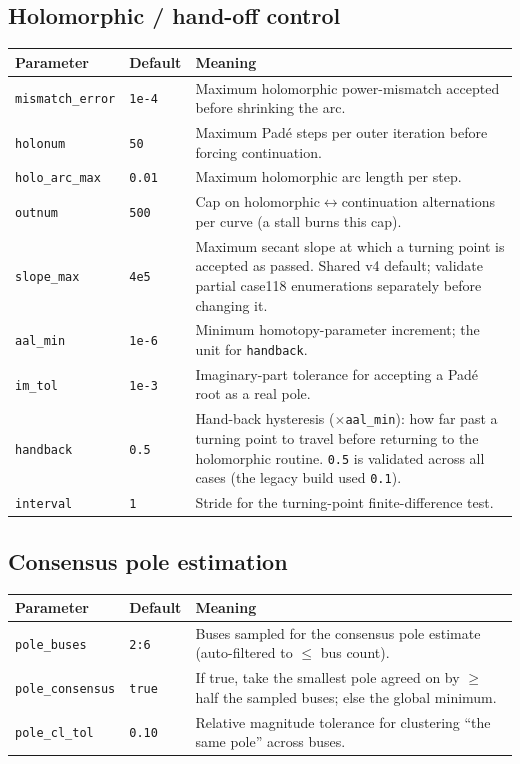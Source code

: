 \documentclass[11pt,a4paper]{article}
\newcommand{\code}[1]{\texttt{#1}}
\begin{document}
\subsection{Holomorphic / hand-off control}
\begin{center}\small
\begin{longtable}{@{}p{}p{}p{}@{}}
\toprule
\textbf{Parameter} & \textbf{Default} & \textbf{Meaning}\\
\midrule\endhead
\code{mismatch_error}& \code{1e-4} & Maximum holomorphic power-mismatch accepted before shrinking the arc.\\
\code{holonum}      & \code{50}   & Maximum Pad\'e steps per outer iteration before forcing continuation.\\
\code{holo_arc_max} & \code{0.01} & Maximum holomorphic arc length per step.\\
\code{outnum}       & \code{500}  & Cap on holomorphic$\leftrightarrow$continuation alternations per curve (a stall burns this cap).\\
\code{slope_max}    & \code{4e5}  & Maximum secant slope at which a turning point is accepted as passed. Shared v4 default; validate partial case118 enumerations separately before changing it.\\
\code{aal_min}      & \code{1e-6} & Minimum homotopy-parameter increment; the unit for \code{handback}.\\
\code{im_tol}       & \code{1e-3} & Imaginary-part tolerance for accepting a Pad\'e root as a real pole.\\
\code{handback}     & \code{0.5}  & Hand-back hysteresis ($\times$\code{aal_min}): how far past a turning point to travel before returning to the holomorphic routine. \code{0.5} is validated across all cases (the legacy build used \code{0.1}).\\
\code{interval}     & \code{1}    & Stride for the turning-point finite-difference test.\\
\bottomrule
\end{longtable}
\end{center}

\subsection{Consensus pole estimation}
\begin{center}\small
\begin{longtable}{@{}p{}p{}p{}@{}}
\toprule
\textbf{Parameter} & \textbf{Default} & \textbf{Meaning}\\
\midrule\endhead
\code{pole_buses}     & \code{2:6}      & Buses sampled for the consensus pole estimate (auto-filtered to $\le$ bus count).\\
\code{pole_consensus}  & \code{true}     & If true, take the smallest pole agreed on by $\ge$ half the sampled buses; else the global minimum.\\
\code{pole_cl_tol}     & \code{0.10}     & Relative magnitude tolerance for clustering ``the same pole'' across buses.\\
\bottomrule
\end{longtable}
\end{center}
\end{document}
